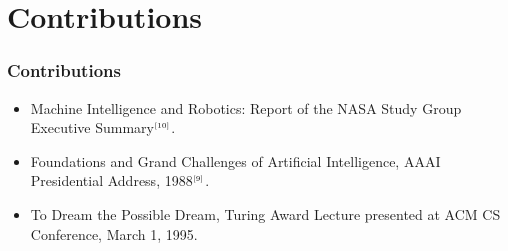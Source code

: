 \documentclass{beamer}
\begin{document}
 \section{Contributions}
\begin{frame}
\transwipe
 \frametitle{Contributions}
 \begin{itemize}
  \item Machine Intelligence and Robotics: Report of the NASA Study Group 
   Executive Summary$^{\tiny\cite{10}}$.
  \item Foundations and Grand Challenges of Artificial Intelligence, AAAI 
   Presidential Address, 1988$^{\tiny\cite{9}}$.
  \item To Dream the Possible Dream, Turing Award Lecture presented at ACM
   CS Conference, March 1, 1995.
 \end{itemize}
\end{frame}
 
\end{document}
